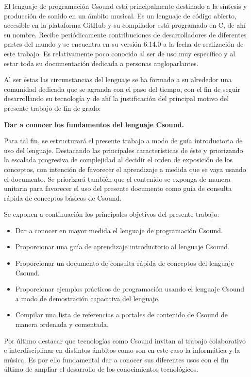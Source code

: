 

El lenguaje de programaci\'on Csound est\'a principalmente destinado a la s\'intesis y producci\'on de sonido en un \'ambito musical.
Es un lenguaje de c\'odigo abierto, accesible en la plataforma GitHub y su compilador está programado en C, de ahí su nombre.
Recibe peri\'odicamente contribuciones de desarrolladores de diferentes partes del mundo y se encuentra en su versi\'on 6.14.0 a la fecha de realizaci\'on de este trabajo.
Es relativamente poco conocido al ser de uso muy específico y al estar toda su documentación dedicada a personas angloparlantes.

Al ser \'estas las circunstancias del lenguaje se ha formado a su alrededor una comunidad dedicada que se agranda con el paso del tiempo, con el fin de seguir desarrollando su tecnología y 
de ahí la justificación del principal motivo del presente trabajo de fin de grado: \bigskip

\begin{center}
\textbf{Dar a conocer los fundamentos del lenguaje Csound.}\bigskip
\end{center}

Para tal fin, se estructurará el presente trabajo a modo de guía introductoria de uso del lenguaje. Destacando las principales características de éste y priorizando la escalada progresiva de 
complejidad al decidir el orden de exposición de los conceptos, con intención de favorecer el aprendizaje a medida que se vaya usando el documento. Se priorizará también que el contenido se exponga de manera unitaria 
para favorecer el uso del presente documento como guía de consulta rápida de conceptos básicos de Csound.\bigskip

Se exponen a continuación los principales objetivos del presente trabajo: 
\begin{itemize}
\item Dar a conocer en mayor medida el lenguaje de programación Csound.
\item Proporcionar una guía de aprendizaje introductorio al lenguaje Csound.
\item Proporcionar un documento de consulta rápida de conceptos del lenguaje Csound.
\item Proporcionar ejemplos prácticos de programación usando el lenguaje Csound a modo de demostración capacitiva del lenguaje.
\item Compilar una lista de referencias a portales de contenido de Csound de manera ordenada y comentada.
\end{itemize}

Por último destacar que tecnologías como Csound invitan al trabajo colaborativo e interdisciplinar en distintos ámbitos como son en este caso la informática y la música. Es por ello fundamental dar a conocer sus diferentes usos con el fin último de ampliar 
el desarrollo de los conocimientos tecnológicos.


